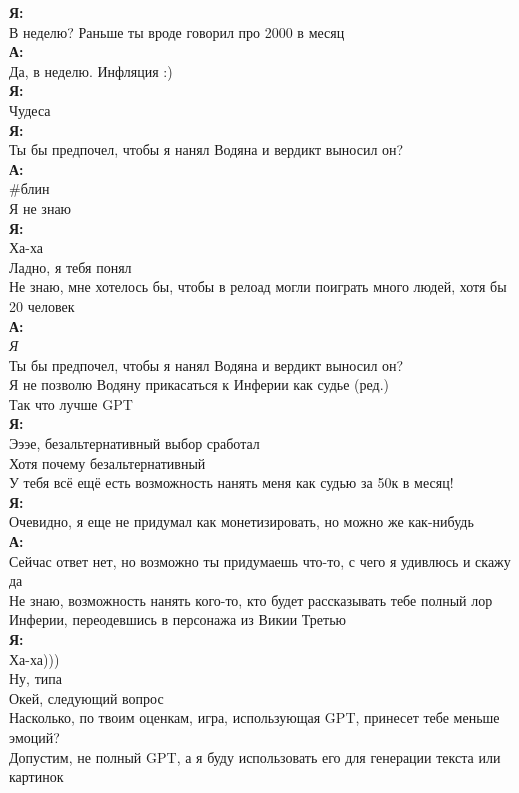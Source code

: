 \textbf{Я:}\\
В неделю? Раньше ты вроде говорил про 2000 в месяц\\
\textbf{А:}\\
Да, в неделю. Инфляция :)\\

\textbf{Я:}\\
Чудеса\\
\textbf{Я:}\\
Ты бы предпочел, чтобы я нанял Водяна и вердикт выносил он?\\

\textbf{А:}\\
\#блин\\
Я не знаю\\

\textbf{Я:}\\
Ха-ха\\
Ладно, я тебя понял\\
Не знаю, мне хотелось бы, чтобы в релоад могли поиграть много людей, хотя бы 20 человек\\

\textbf{А:}\\
\textit{Я}\\
Ты бы предпочел, чтобы я нанял Водяна и вердикт выносил он?\\
Я не позволю Водяну прикасаться к Инферии как судье (ред.)\\
Так что лучше GPT\\

\textbf{Я:}\\
Эээе, безальтернативный выбор сработал\\
Хотя почему безальтернативный\\
У тебя всё ещё есть возможность нанять меня как судью за 50к в месяц!\\

\textbf{Я:}\\
Очевидно, я еще не придумал как монетизировать, но можно же как-нибудь\\

\textbf{А:}\\
Сейчас ответ нет, но возможно ты придумаешь что-то, с чего я удивлюсь и скажу да\\
Не знаю, возможность нанять кого-то, кто будет рассказывать тебе полный лор Инферии, переодевшись в персонажа из Викии Третью\\

\textbf{Я:}\\
Ха-ха)))\\
Ну, типа\\
Окей, следующий вопрос\\
Насколько, по твоим оценкам, игра, использующая GPT, принесет тебе меньше эмоций?\\
Допустим, не полный GPT, а я буду использовать его для генерации текста или картинок\\


